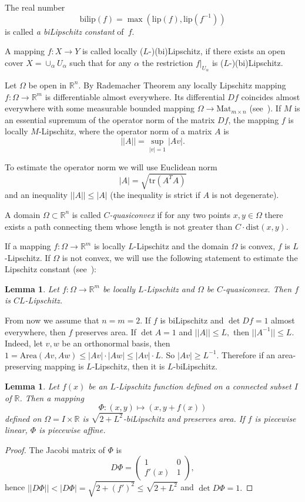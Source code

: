 \documentclass[12pt]{article}
\newtheorem{lemm}[prop]{Lemma}
\theoremstyle{definition}
\begin{document}
The real number
$$\mathrm{bilip}(f) = \max\left(\mathrm{lip}(f), \mathrm{lip}\left(f^{-1}\right)\right)$$ 
is called {\it a biLipschitz constant} of~$f$.

A mapping $f:X\to Y$ is called locally ($L$-)(bi)Lipschitz, if there exists an open cover $X = \cup_{\alpha} U_{\alpha}$ such that for any $\alpha$ the restriction $f\big|_{U_{\alpha}}$ is ($L$-)(bi)Lipschitz.

Let $\Omega$ be open in $\mathbb R^n.$ By Rademacher Theorem any locally Lipschitz mapping $f:\Omega\to\mathbb R^m$ is differentiable almost everywhere. Its differential $Df$ coincides almost everywhere with some measurable bounded mapping $\Omega \to \mathrm{Mat}_{m\times n}$ (see~\cite[Section 4]{Hein}). If $M$ is an essential supremum of the operator norm of the matrix $Df$, the mapping $f$ is locally $M$-Lipschitz, where the operator norm of a matrix $A$ is
$$||A|| = \sup\limits_{|v|=1}|Av|.$$

To estimate the operator norm we will use Euclidean norm
$$|A| = \sqrt{\mathrm{tr} \left(A^T A\right)}$$
and an inequality $||A|| \le |A|$ (the inequality is strict if $A$ is not degenerate).

A domain $\Omega\subset \mathbb R^n$ is called {\it $C$-quasiconvex} if for any two points $x,y\in\Omega$ there exists a path connecting them whose length is not greater than $C\cdot\mathrm{dist}(x,y).$

If a mapping $f:\Omega\to\mathbb R^m$ is locally $L$-Lipschitz and the domain $\Omega$ is convex, $f$ is $L$-Lipschitz. If $\Omega$ is not convex, we will use the following statement to estimate the Lipschitz constant (see~\cite[Lemma 2.2]{Hein}):

\begin{lemm}
Let $f:\Omega\to\mathbb R^m$ be locally $L$-Lipschitz and $\Omega$ be $C$-quasiconvex. Then $f$ is $CL$-Lipschitz.
\end{lemm}

From now we assume that $n=m=2.$ If $f$ is biLipschitz and $\det Df = 1$ almost everywhere, then $f$ preserves area. If $\det A = 1$ and $||A||\le L,$ then $||A^{-1}|| \le L.$ Indeed, let $v,w$ be an orthonormal basis, then $1 = \mathrm{Area}(Av, Aw) \le |Av|\cdot|Aw| \le |Av|\cdot L.$ So $|Av|\ge L^{-1}.$ Therefore if an area-preserving mapping is $L$-Lipschitz, then it is $L$-biLipschitz.

\begin{lemm}
\label{skew-lemma}
Let $f(x)$ be an $L$-Lipschitz function defined on a connected subset $I$ of $\mathbb R$. Then a mapping
$$
\Phi: (x,y) \mapsto (x, y + f(x))
$$
defined on $\Omega = I\times\mathbb R$ is $\sqrt{2+L^2}$-biLipschitz and preserves area. If $f$ is piecewise linear, $\Phi$ is piecewise affine.
\end{lemm}
\begin{proof}
The Jacobi matrix of $\Phi$  is
$$
D\Phi = 
\begin{pmatrix}
1 & 0\\
f'(x) & 1
\end{pmatrix},
$$
hence $||D\Phi|| < |D\Phi| = \sqrt{2 + \left(f'\right)^2} \le \sqrt{2+L^2}$ and $\det D\Phi = 1.$
\end{proof}
\end{document}

